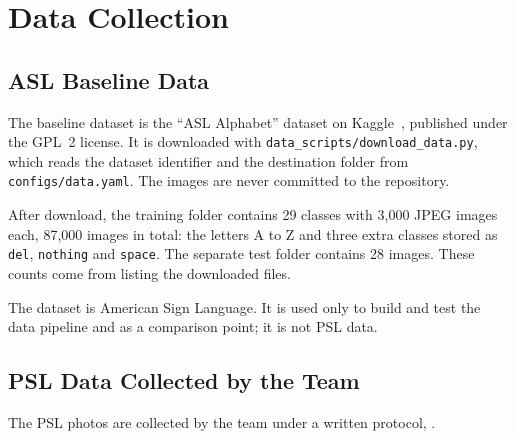 \section{Data Collection}
\label{sec:data-collection}

\subsection{ASL Baseline Data}

The baseline dataset is the ``ASL Alphabet'' dataset on Kaggle~\cite{asl_alphabet_kaggle}, published under the GPL~2 license. It is downloaded with \texttt{data\_scripts/download\_data.py}, which reads the dataset identifier and the destination folder from \texttt{configs/data.yaml}. The images are never committed to the repository.

After download, the training folder contains 29 classes with 3{,}000 JPEG images each, 87{,}000 images in total: the letters A to Z and three extra classes stored as \texttt{del}, \texttt{nothing} and \texttt{space}. The separate test folder contains 28 images. These counts come from listing the downloaded files.

The dataset is American Sign Language. It is used only to build and test the data pipeline and as a comparison point; it is not PSL data.

\subsection{PSL Data Collected by the Team}

The PSL photos are collected by the team under a written protocol, .

